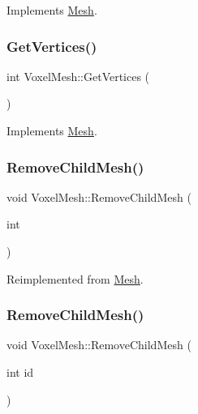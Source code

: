 Implements \mbox{\hyperlink{class_mesh_ad8480168123d9a70563b00cdbe7e73ed}{Mesh}}.

\mbox{\label{class_voxel_mesh_a6a06be81275f5e98f77382ee9dfe9a07}} 
\subsubsection{\texorpdfstring{GetVertices()}{GetVertices()}\hspace{0.1cm}{\footnotesize\ttfamily [2/2]}}
{\footnotesize\ttfamily int Voxel\+Mesh\+::\+Get\+Vertices (\begin{DoxyParamCaption}{ }\end{DoxyParamCaption})\hspace{0.3cm}{\ttfamily [virtual]}}



Implements \mbox{\hyperlink{class_mesh_ad8480168123d9a70563b00cdbe7e73ed}{Mesh}}.

\mbox{\label{class_voxel_mesh_ae86555f2df9a4ba3b21b62a4bd26b591}} 
\subsubsection{\texorpdfstring{RemoveChildMesh()}{RemoveChildMesh()}\hspace{0.1cm}{\footnotesize\ttfamily [1/2]}}
{\footnotesize\ttfamily void Voxel\+Mesh\+::\+Remove\+Child\+Mesh (\begin{DoxyParamCaption}\item[{int}]{ }\end{DoxyParamCaption})\hspace{0.3cm}{\ttfamily [virtual]}}



Reimplemented from \mbox{\hyperlink{class_mesh_a530e7b4ea82226f6e15b0ff6c36ea3d8}{Mesh}}.

\mbox{\label{class_voxel_mesh_ae86555f2df9a4ba3b21b62a4bd26b591}} 
\subsubsection{\texorpdfstring{RemoveChildMesh()}{RemoveChildMesh()}\hspace{0.1cm}{\footnotesize\ttfamily [2/2]}}
{\footnotesize\ttfamily void Voxel\+Mesh\+::\+Remove\+Child\+Mesh (\begin{DoxyParamCaption}\item[{int}]{id }\end{DoxyParamCaption})\hspace{0.3cm}{\ttfamily [virtual]}}



